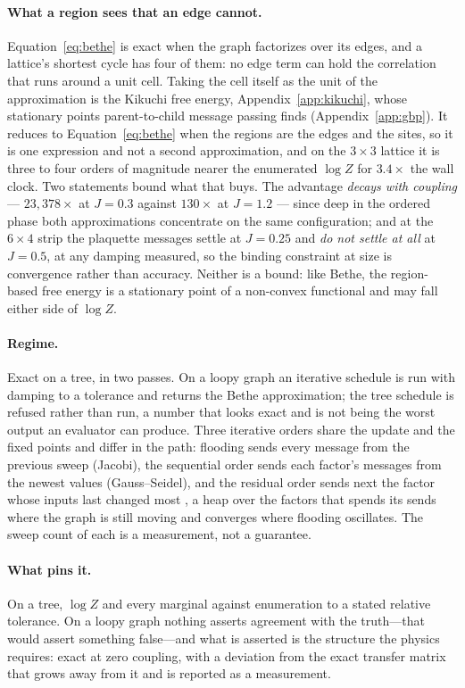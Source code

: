 \documentclass[11pt,a4paper]{article}
\begin{document}
\paragraph{What a region sees that an edge cannot.}
Equation~\ref{eq:bethe} is exact when the graph factorizes over its edges, and
a lattice's shortest cycle has four of them: no edge term can hold the
correlation that runs around a unit cell. Taking the cell itself as the unit of
the approximation is the Kikuchi free energy, Appendix~\ref{app:kikuchi}, whose
stationary points parent-to-child message passing finds
(Appendix~\ref{app:gbp}). It reduces to Equation~\ref{eq:bethe} when the
regions are the edges and the sites, so it is one expression and not a second
approximation, and on the $3 \times 3$ lattice it is three to four orders of
magnitude nearer the enumerated $\log Z$ for $3.4\times$ the wall clock. Two
statements bound what that buys. The advantage \emph{decays with coupling} ---
$23{,}378\times$ at $J = 0.3$ against $130\times$ at $J = 1.2$ --- since deep
in the ordered phase both approximations concentrate on the same configuration;
and at the $6 \times 4$ strip the plaquette messages settle at $J = 0.25$ and
\emph{do not settle at all} at $J = 0.5$, at any damping measured, so the
binding constraint at size is convergence rather than accuracy. Neither is a
bound: like Bethe, the region-based free energy is a stationary point of a
non-convex functional and may fall either side of $\log Z$.

\paragraph{Regime.}
Exact on a tree, in two passes. On a loopy graph an iterative schedule is run
with damping to a tolerance and returns the Bethe approximation; the tree
schedule is refused rather than run, a number that looks exact and is not being
the worst output an evaluator can produce. Three iterative orders share the
update and the fixed points and differ in the path: flooding sends every
message from the previous sweep (Jacobi), the sequential order sends each
factor's messages from the newest values (Gauss--Seidel), and the residual
order sends next the factor whose inputs last changed most
\citep{elidan2006}, a heap over the factors that spends its sends where the
graph is still moving and converges where flooding oscillates. The sweep count
of each is a measurement, not a guarantee.

\paragraph{What pins it.}
On a tree, $\log Z$ and every marginal against enumeration to a stated relative
tolerance. On a loopy graph nothing asserts agreement with the truth---that
would assert something false---and what is asserted is the structure the
physics requires: exact at zero coupling, with a deviation from the exact
transfer matrix that grows away from it and is reported as a measurement.
\end{document}
